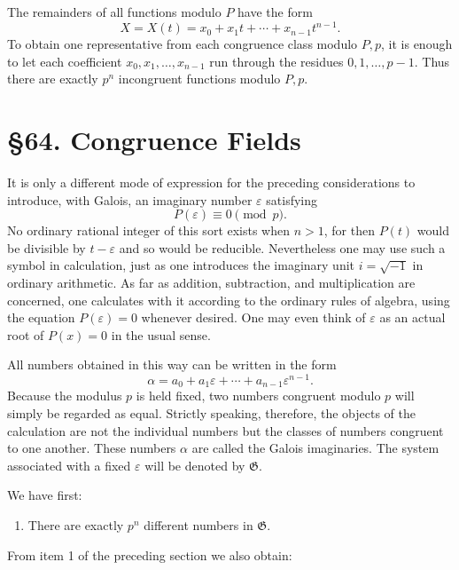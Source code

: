 \documentclass[11pt,a4paper]{book}
\newcommand{\webersection}[2]{\clearpage\section*{\S #1. #2}}
\begin{document}
The remainders of all functions modulo \(P\) have the form
\begin{equation}\label{eq:63-7}
 X=X(t)=x_0+x_1t+\cdots+x_{n-1}t^{n-1}.
\end{equation}
To obtain one representative from each congruence class modulo \(P,p\), it is enough to let each coefficient \(x_0,x_1,\ldots,x_{n-1}\) run through the residues \(0,1,\ldots,p-1\).  Thus there are exactly \(p^n\) incongruent functions modulo \(P,p\).

\webersection{64}{Congruence Fields}

It is only a different mode of expression for the preceding considerations to introduce, with Galois, an imaginary number \(\varepsilon\) satisfying
\begin{equation}\label{eq:64-1}
 P(\varepsilon)\equiv0\pmod p.
\end{equation}
No ordinary rational integer of this sort exists when \(n>1\), for then \(P(t)\) would be divisible by \(t-\varepsilon\) and so would be reducible.  Nevertheless one may use such a symbol in calculation, just as one introduces the imaginary unit \(i=\sqrt{-1}\) in ordinary arithmetic.  As far as addition, subtraction, and multiplication are concerned, one calculates with it according to the ordinary rules of algebra, using the equation \(P(\varepsilon)=0\) whenever desired.  One may even think of \(\varepsilon\) as an actual root of \(P(x)=0\) in the usual sense.

All numbers obtained in this way can be written in the form
\begin{equation}\label{eq:64-2}
 \alpha=a_0+a_1\varepsilon+\cdots+a_{n-1}\varepsilon^{n-1}.
\end{equation}
Because the modulus \(p\) is held fixed, two numbers congruent modulo \(p\) will simply be regarded as equal.  Strictly speaking, therefore, the objects of the calculation are not the individual numbers but the classes of numbers congruent to one another.  These numbers \(\alpha\) are called the Galois imaginaries.  The system associated with a fixed \(\varepsilon\) will be denoted by \(\mathfrak G\).

We have first:

\begin{enumerate}[label=\arabic*.,resume]
\item There are exactly \(p^n\) different numbers in \(\mathfrak G\).
\end{enumerate}
From item 1 of the preceding section we also obtain:
\end{document}
